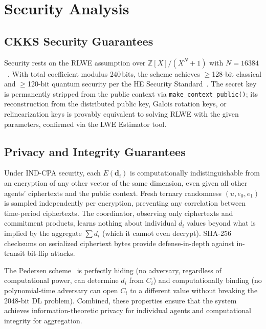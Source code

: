 \documentclass[conference]{IEEEtran}
\begin{document}
\section{Security Analysis}
\label{sec:security}

\subsection{CKKS Security Guarantees}

Security rests on the RLWE assumption over $\mathbb{Z}[X]/(X^N{+}1)$ with $N=16384$~\cite{Brakerski2011}. With total coefficient modulus 240\,bits, the scheme achieves $\geq$128-bit classical and $\geq$120-bit quantum security per the HE Security Standard~\cite{HEStandard2018}. The secret key is permanently stripped from the public context via \texttt{make\_context\_public()}; its reconstruction from the distributed public key, Galois rotation keys, or relinearization keys is provably equivalent to solving RLWE with the given parameters, confirmed via the LWE Estimator tool.

\subsection{Privacy and Integrity Guarantees}

Under IND-CPA security, each $E(\mathbf{d}_i)$ is computationally indistinguishable from an encryption of any other vector of the same dimension, even given all other agents' ciphertexts and the public context. Fresh ternary randomness $(u,e_0,e_1)$ is sampled independently per encryption, preventing any correlation between time-period ciphertexts. The coordinator, observing only ciphertexts and commitment products, learns nothing about individual $d_i$ values beyond what is implied by the aggregate $\sum d_i$ (which it cannot even decrypt). SHA-256 checksums on serialized ciphertext bytes provide defense-in-depth against in-transit bit-flip attacks.

The Pedersen scheme~\cite{Pedersen1991} is perfectly hiding (no adversary, regardless of computational power, can determine $d_i$ from $C_i$) and computationally binding (no polynomial-time adversary can open $C_i$ to a different value without breaking the 2048-bit DL problem). Combined, these properties ensure that the system achieves information-theoretic privacy for individual agents and computational integrity for aggregation.
\end{document}
